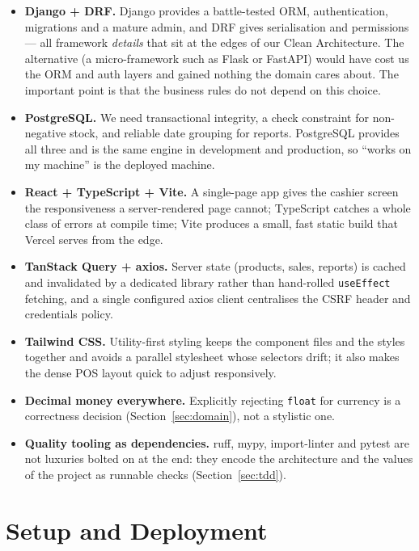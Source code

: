\documentclass[11pt,a4paper]{article}
\begin{document}
\begin{itemize}[leftmargin=1.4em]
  \item \textbf{Django + DRF.} Django provides a battle-tested ORM, authentication, migrations and a
  mature admin, and DRF gives serialisation and permissions --- all framework \emph{details} that sit
  at the edges of our Clean Architecture. The alternative (a micro-framework such as Flask or FastAPI)
  would have cost us the ORM and auth layers and gained nothing the domain cares about. The important
  point is that the business rules do not depend on this choice.
  \item \textbf{PostgreSQL.} We need transactional integrity, a check constraint for non-negative
  stock, and reliable date grouping for reports. PostgreSQL provides all three and is the same engine
  in development and production, so ``works on my machine'' is the deployed machine.
  \item \textbf{React + TypeScript + Vite.} A single-page app gives the cashier screen the
  responsiveness a server-rendered page cannot; TypeScript catches a whole class of errors at compile
  time; Vite produces a small, fast static build that Vercel serves from the edge.
  \item \textbf{TanStack Query + axios.} Server state (products, sales, reports) is cached and
  invalidated by a dedicated library rather than hand-rolled \texttt{useEffect} fetching, and a single
  configured axios client centralises the CSRF header and credentials policy.
  \item \textbf{Tailwind CSS.} Utility-first styling keeps the component files and the styles together
  and avoids a parallel stylesheet whose selectors drift; it also makes the dense POS layout quick to
  adjust responsively.
  \item \textbf{Decimal money everywhere.} Explicitly rejecting \texttt{float} for currency is a
  correctness decision (Section~\ref{sec:domain}), not a stylistic one.
  \item \textbf{Quality tooling as dependencies.} ruff, mypy, import-linter and pytest are not luxuries
  bolted on at the end: they encode the architecture and the values of the project as runnable checks
  (Section~\ref{sec:tdd}).
\end{itemize}

\section{Setup and Deployment}
\label{sec:deploy}
\end{document}
